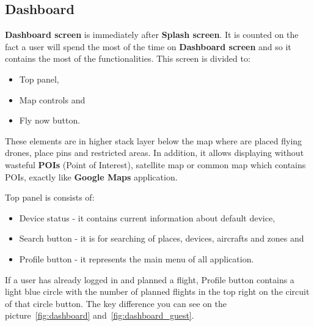\subsection{Dashboard}\label{subsec:dashboard2}

\textbf{Dashboard screen} is immediately after \textbf{Splash screen}.
It is counted on the fact a user will spend the most of the time on \textbf{Dashboard screen} and so it contains the most of the functionalities.
This screen is divided to:
\begin{itemize}
    \item Top panel,
    \item Map controls and
    \item Fly now button.
\end{itemize}
These elements are in higher stack layer below the map where are placed flying drones, place pins and restricted areas.
In addition, it allows displaying without wasteful \textbf{POIs} (Point of Interest)\cite{poi}, satellite map or common map which contains POIs, exactly like \textbf{Google Maps} application.

Top panel is consists of:
\begin{itemize}
    \item Device status - it contains current information about default device,
    \item Search button - it is for searching of places, devices, aircrafts and zones and
    \item Profile button - it represents the main menu of all application.
\end{itemize}
If a user has already logged in and planned a flight, Profile button contains a light blue circle with the number of planned flights in the top right on the circuit of that circle button.
The key difference you can see on the picture~\ref{fig:dashboard} and~\ref{fig:dashboard_guest}.

